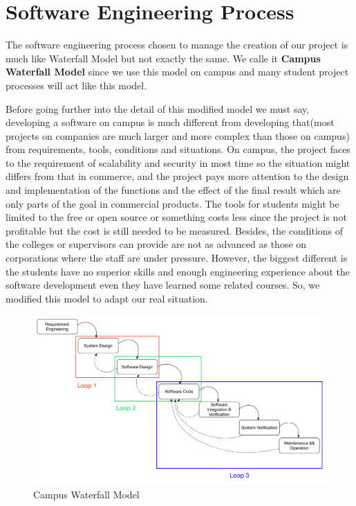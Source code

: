 \documentclass[a4paper,11pt]{article}
\begin{document}
\section{Software Engineering Process}
	The software engineering process chosen to manage the creation of our project is much like Waterfall Model but not exactly the same. We calle it \textbf{Campus Waterfall Model} since we use this model on campus and many student project processes will act like this model.

Before going further into the detail of this modified model we must say, developing a software on campus is much different from developing that(most projects on companies are much larger and more complex than those on campus) from requirements, tools, conditions and situations. On campus, the project faces to the requirement of scalability and security in most time so the situation might differs from that in commerce, and the project pays more attention to the design and implementation of the functions and the effect of the final result which are only parts of the goal in commercial products. The tools for students might be limited to the free or open source or something costs less since the project is not profitable but the cost is still needed to be measured. Besides, the conditions of the colleges or supervisors can provide are not as advanced as those on corporations where the staff are under pressure. However, the biggest different is the students have no superior skills and enough engineering experience about the software development even they have learned some related courses. So, we modified this model to adapt our real situation.

\begin{figure}[htbp]
\includegraphics[scale=0.32]{image/campus_waterfall.pdf}
\caption{Campus Waterfall Model}
\end{figure}
\end{document}
